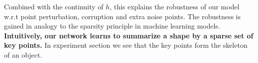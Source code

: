 Combined with the continuity of $h$, this explains the robustness of our model w.r.t point perturbation, corruption and extra noise points. The robustness is gained in analogy to the sparsity principle in machine learning models. {\bf  Intuitively, our network learns to summarize a shape by a sparse set of key points.} In experiment section we see that the key points form the skeleton of an object.

